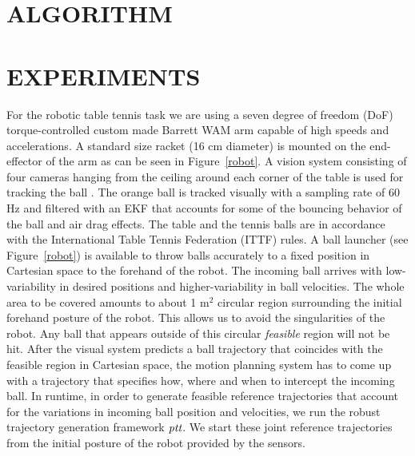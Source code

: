 \documentclass[letterpaper, 10 pt, conference]{ieeeconf}
\newcommand{\alg}{\emph{ptt}} %
\begin{document}
\section{ALGORITHM}\label{alg}

\section{EXPERIMENTS}\label{results}


For the robotic table tennis task we are using a seven degree of freedom (DoF) torque-controlled custom made Barrett WAM arm capable of high speeds and accelerations. A standard size racket (16 cm diameter) is mounted on the end-effector of the arm as can be seen in Figure~\ref{robot}. A vision system consisting of four cameras hanging from the ceiling around each corner of the table is used for tracking the ball \cite{Lampert12}. The orange ball is tracked visually with a sampling rate of 60 Hz and filtered with an EKF that accounts for some of the bouncing behavior of the ball and air drag effects. The table and the tennis balls are in accordance with the International Table Tennis Federation (ITTF) rules.
%
A ball launcher (see Figure~\ref{robot}) is available to throw balls accurately to a fixed position in Cartesian space to the forehand of the robot. The incoming ball arrives with low-variability in desired positions and higher-variability in ball velocities. The whole area to be covered amounts to about 1 m$^2$ circular region surrounding the initial forehand posture of the robot. This allows us to avoid the singularities of the robot. Any ball that appears outside of this circular \emph{feasible} region will not be hit.
%
After the visual system predicts a ball trajectory that coincides with the feasible region in Cartesian space, the motion planning system has to come up with a trajectory that specifies how, where and when to intercept the incoming ball. 
%
In runtime, in order to generate feasible reference trajectories that account for the variations in incoming ball position and velocities, we run the robust trajectory generation framework $\alg$. We start these joint reference trajectories from the initial posture of the robot provided by the sensors.
\end{document}
